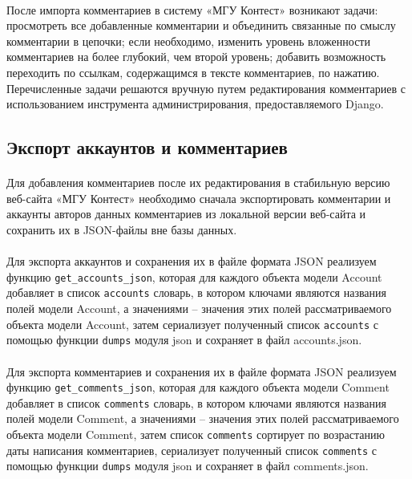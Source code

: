 \documentclass[12pt, a4paper, oneside]{article}
\begin{document}
\paragraph{}
После импорта комментариев в систему «МГУ Контест» возникают задачи: просмотреть все добавленные комментарии и объединить связанные по смыслу комментарии в цепочки; если необходимо, изменить уровень вложенности комментариев на более глубокий, чем второй уровень; добавить возможность переходить по ссылкам, содержащимся в тексте комментариев, по нажатию. Перечисленные задачи решаются вручную путем редактирования комментариев с использованием инструмента администрирования, предоставляемого Django.
\vspace{1cm}

\subsection{Экспорт аккаунтов и комментариев}
\paragraph{}
Для добавления комментариев после их редактирования в стабильную версию веб-сайта «МГУ Контест» необходимо сначала экспортировать комментарии и аккаунты авторов данных комментариев из локальной версии веб-сайта и сохранить их в JSON-файлы вне базы данных.
\paragraph{}
Для экспорта аккаунтов и сохранения их в файле формата JSON реализуем функцию \texttt{get\_accounts\_json}, которая для каждого объекта модели Account добавляет в список \texttt{accounts} словарь, в котором ключами являются названия полей модели Account, а значениями – значения этих полей рассматриваемого объекта модели Account, затем сериализует полученный список \texttt{accounts} с помощью функции \texttt{dumps} модуля json и сохраняет в файл accounts.json.
\paragraph{}
Для экспорта комментариев и сохранения их в файле формата JSON реализуем функцию \texttt{get\_comments\_json}, которая для каждого объекта модели Comment добавляет в список \texttt{comments} словарь, в котором ключами являются названия полей модели Comment, а значениями – значения этих полей рассматриваемого объекта модели Comment, затем список \texttt{comments} сортирует по возрастанию даты написания комментариев, сериализует полученный список \texttt{comments} с помощью функции \texttt{dumps} модуля json и сохраняет в файл comments.json.
\vspace{1cm}
\end{document}
